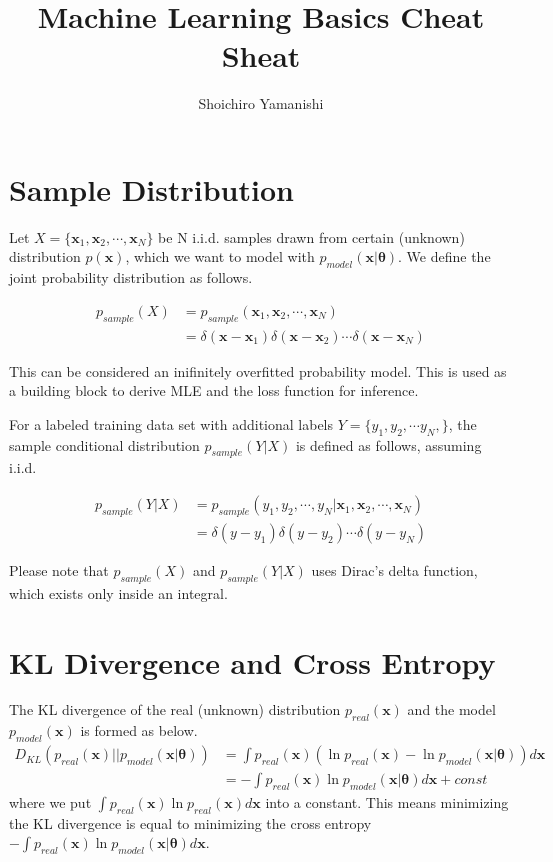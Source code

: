 \documentclass[a4]{article}
\title{Machine Learning Basics Cheat Sheat}
\author{Shoichiro Yamanishi}
\begin{document}
\maketitle

\section{Sample Distribution}

Let $X= \{\bm{x}_1, \bm{x}_2, \cdots, \bm{x}_N\}$ be N i.i.d. samples drawn
from certain (unknown) distribution $p(\bm{x})$,
which we want to model with $p_{model}(\bm{x}|\bm{\theta})$.
We define the joint probability distribution as follows.

\begin{equation}
\begin{aligned}
p_{sample}(X) &= p_{sample}(\bm{x}_1, \bm{x}_2, \cdots, \bm{x}_N)\\
&= \delta(\bm{x}-\bm{x}_1)\delta(\bm{x}-\bm{x}_2)
\cdots\delta(\bm{x}-\bm{x}_N)
\end{aligned}
\end{equation}

This can be considered an inifinitely overfitted probability model.
This is used as a building block 
to derive MLE and the loss function for inference.


For a labeled training data set with additional labels
$Y =\{y_1, y_2, \cdots y_N,\}$, the sample conditional distribution
$p_{sample}(Y|X)$ is defined as follows, assuming i.i.d.

\begin{equation}
\begin{aligned}
p_{sample}(Y|X) &= 
p_{sample}(y_1, y_2, \cdots, y_N|\bm{x}_1, \bm{x}_2, \cdots, \bm{x}_N)\\
&= \delta(y-y_1)\delta(y-y_2)\cdots\delta(y-y_N)
\end{aligned}
\end{equation}

Please note that $p_{sample}(X)$ and $p_{sample}(Y|X)$ 
uses Dirac's delta function, which exists only inside an integral.


\section{KL Divergence and Cross Entropy}
The KL divergence of the real (unknown) distribution $p_{real}(\bm{x})$
and the model $p_{model}(\bm{x})$ is formed as below.
\begin{equation}
\begin{aligned}
D_{KL}\left(p_{real}(\bm{x}) || p_{model}(\bm{x}|\bm{\theta})\right)
&= \int p_{real}(\bm{x}) \left(
    \ln p_{real}(\bm{x}) - \ln p_{model}(\bm{x}|\bm{\theta}) \right) d\bm{x}\\
&= - \int p_{real}(\bm{x}) \ln p_{model}(\bm{x}|\bm{\theta}) d\bm{x} + const
\end{aligned}
\end{equation}
where we put $\int p_{real}(\bm{x}) \ln  p_{real}(\bm{x})d\bm{x}$ into a
constant. 
This means minimizing the KL divergence is equal to minimizing the cross
entropy
$- \int p_{real}(\bm{x}) \ln p_{model}(\bm{x}|\bm{\theta}) d\bm{x}$.
\end{document}
